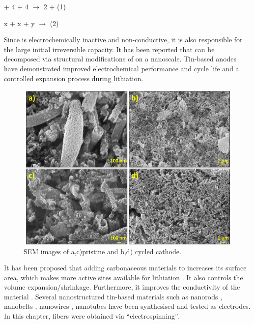 \begin{center}
 + 4 + 4 $\longrightarrow$ 2 +  (1) 
\end{center}
\begin{center}
x + x + y $\longrightarrow$   (2)
\end{center}

Since  is electrochemically inactive and non-conductive, it is also responsible for the large initial irreversible capacity. It has been reported that  can be decomposed via structural modifications of  on a nanoscale. Tin-based anodes have demonstrated improved electrochemical performance and cycle life and a controlled expansion process during lithiation.  

\begin{figure}[th!]
\centering
\includegraphics[width=\textwidth]{Figures/chap6fig/SnO2SEM}
\caption{SEM images of a,c)pristine and b,d) cycled  cathode.}
\label{Figures/chap6fig:SnO2SEM}
\end{figure}

It has been proposed that adding carbonaceous materials to  increases its surface area, which makes more active sites available for lithiation \cite{navarrosuarez_2d_2018}. It also controls the volume expansion/shrinkage. Furthermore, it improves the conductivity of the material \cite{nowak_composites_2018}. Several nanostructured tin-based materials such as nanorods \cite{liu_direct_2009}, nanobelts \cite{duan_single_2005}, nanowires \cite{huang_situ_2010}, nanotubes \cite{wang_large-scale_2011} have been synthesised and tested as electrodes. In this chapter,  fibers were obtained via  \enquote{electrospinning}. 

